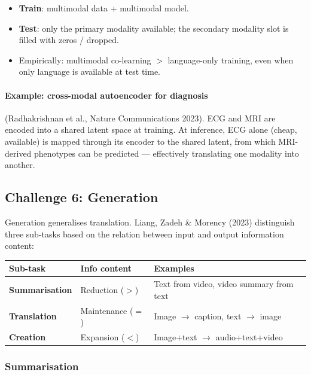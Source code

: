 \documentclass[11pt,a4paper]{article}
\theoremstyle{definition}
\theoremstyle{plain}
\theoremstyle{remark}
\begin{document}
\begin{tcolorbox}[colback=blue!5!white, colframe=blue!60!black, title={Co-learning vs.\ unimodal}]
\begin{itemize}
    \item \textbf{Train}: multimodal data + multimodal model.
    \item \textbf{Test}: only the primary modality available; the secondary modality slot is filled with zeros / dropped.
    \item Empirically: multimodal co-learning $>$ language-only training, even when only language is available at test time.
\end{itemize}
\end{tcolorbox}

\paragraph{Example: cross-modal autoencoder for diagnosis} (Radhakrishnan et al., Nature Communications 2023). ECG and MRI are encoded into a shared latent space at training. At inference, ECG alone (cheap, available) is mapped through its encoder to the shared latent, from which MRI-derived phenotypes can be predicted --- effectively translating one modality into another.

\subsection{Challenge 6: Generation}

Generation generalises translation. Liang, Zadeh \& Morency (2023) distinguish three sub-tasks based on the relation between input and output information content:

\begin{center}
\begin{tabular}{lll}
    \hline
    \textbf{Sub-task} & \textbf{Info content} & \textbf{Examples} \\
    \hline
    \textbf{Summarisation} & Reduction ($>$)  & Text from video, video summary from text \\
    \textbf{Translation}   & Maintenance ($=$) & Image $\to$ caption, text $\to$ image \\
    \textbf{Creation}      & Expansion ($<$)   & Image+text $\to$ audio+text+video \\
    \hline
\end{tabular}
\end{center}

\subsubsection{Summarisation}
\end{document}
